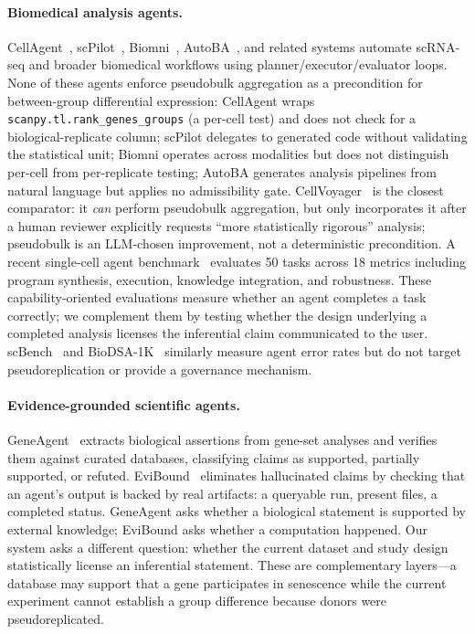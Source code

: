 \documentclass[pmlr,twocolumn,10pt]{jmlr}
\begin{document}
\paragraph{Biomedical analysis agents.}
CellAgent~\citep{xiao2024cellagent}, scPilot~\citep{scpilot2026},
Biomni~\citep{biomni2025}, AutoBA~\citep{autoba2024}, and related systems
automate scRNA-seq and broader biomedical workflows using
planner/executor/evaluator loops. None of these agents enforce pseudobulk
aggregation as a precondition for between-group differential expression:
CellAgent wraps \texttt{scanpy.tl.rank\_genes\_groups} (a per-cell test) and
does not check for a biological-replicate column;
scPilot delegates to generated code without validating the statistical unit;
Biomni operates across modalities but does not distinguish per-cell from
per-replicate testing; AutoBA generates analysis pipelines from natural
language but applies no admissibility gate.
CellVoyager~\citep{cellvoyager2026} is the closest comparator: it
\textit{can} perform pseudobulk aggregation, but only incorporates it
after a human reviewer explicitly requests ``more statistically rigorous''
analysis; pseudobulk is an LLM-chosen improvement, not a deterministic
precondition.
A recent single-cell agent benchmark~\citep{scagentbench2026} evaluates
50 tasks across 18 metrics including program synthesis, execution, knowledge
integration, and robustness.
These capability-oriented evaluations measure whether an agent completes a
task correctly; we complement them by testing whether the design underlying a
completed analysis licenses the inferential claim communicated to the user.
scBench~\citep{scbench2026} and BioDSA-1K~\citep{biodsa2025} similarly measure
agent error rates but do not target pseudoreplication or provide a governance
mechanism.

\paragraph{Evidence-grounded scientific agents.}
GeneAgent~\citep{geneagent2025} extracts biological assertions from gene-set
analyses and verifies them against curated databases, classifying claims as
supported, partially supported, or refuted. EviBound~\citep{evibound2025}
eliminates hallucinated claims by checking that an agent's output is backed by
real artifacts: a queryable run, present files, a completed status. GeneAgent
asks whether a biological statement is supported by external knowledge;
EviBound asks whether a computation happened. Our system asks a different
question: whether the current dataset and study design statistically license
an inferential statement. These are complementary layers---a database may
support that a gene participates in senescence while the current experiment
cannot establish a group difference because donors were pseudoreplicated.
\end{document}

